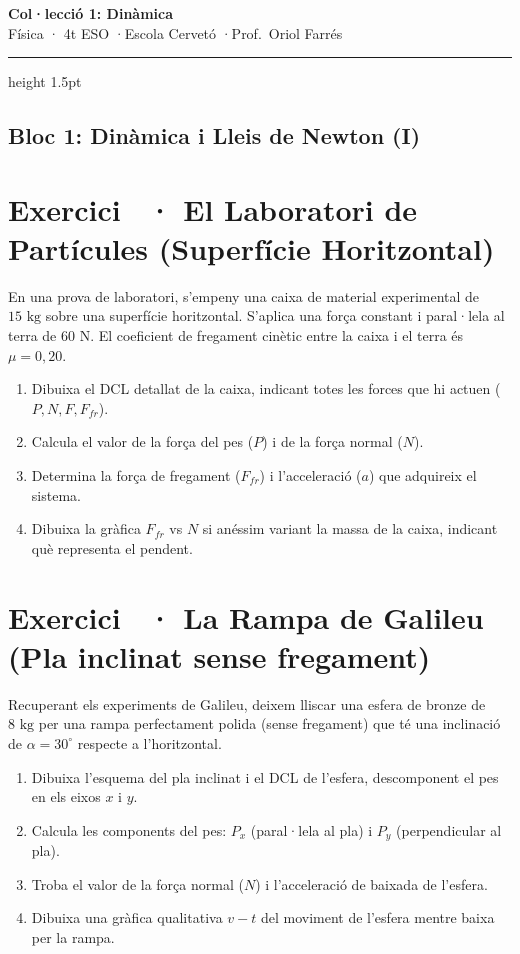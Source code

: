 \documentclass[12pt,a4paper,twoside]{article}
\newcounter{exercici}
\newcommand{\exercici}[1]{%
  \stepcounter{exercici}
  \section*{Exercici \theexercici\ \textnormal{· #1}}
  \vspace{-10pt}
}
\begin{document}
\begin{center}
  \vspace*{-15pt}
  {\Huge\bfseries Col·lecció 1: Dinàmica}\\[8pt]
  {\Large Física · 4t ESO \quad·\quad Escola Cervetó \quad·\quad Prof.\ Oriol Farrés}\\[12pt]
  \hrule height 1.5pt
  \vspace{5pt}
\end{center}

\vspace{0.3cm}

\subsection*{Bloc 1: Dinàmica i Lleis de Newton (I)}

\exercici{El Laboratori de Partícules (Superfície Horitzontal)}
En una prova de laboratori, s'empeny una caixa de material experimental de $15 \text{ kg}$ sobre una superfície horitzontal. S'aplica una força constant i paral·lela al terra de $60 \text{ N}$. El coeficient de fregament cinètic entre la caixa i el terra és $\mu = 0{,}20$.
\begin{enumerate}[label=\textbf{\alph*)}]
  \item Dibuixa el DCL detallat de la caixa, indicant totes les forces que hi actuen ($P, N, F, F_{fr}$).
  \item Calcula el valor de la força del pes ($P$) i de la força normal ($N$).
  \item Determina la força de fregament ($F_{fr}$) i l'acceleració ($a$) que adquireix el sistema.
  \item Dibuixa la gràfica $F_{fr}$ vs $N$ si anéssim variant la massa de la caixa, indicant què representa el pendent.
\end{enumerate}

\vspace{0.5cm}
\exercici{La Rampa de Galileu (Pla inclinat sense fregament)}
Recuperant els experiments de Galileu, deixem lliscar una esfera de bronze de $8 \text{ kg}$ per una rampa perfectament polida (sense fregament) que té una inclinació de $\alpha = 30^\circ$ respecte a l'horitzontal.
\begin{enumerate}[label=\textbf{\alph*)}]
  \item Dibuixa l'esquema del pla inclinat i el DCL de l'esfera, descomponent el pes en els eixos $x$ i $y$.
  \item Calcula les components del pes: $P_x$ (paral·lela al pla) i $P_y$ (perpendicular al pla).
  \item Troba el valor de la força normal ($N$) i l'acceleració de baixada de l'esfera.
  \item Dibuixa una gràfica qualitativa $v-t$ del moviment de l'esfera mentre baixa per la rampa.
\end{enumerate}
\end{document}
